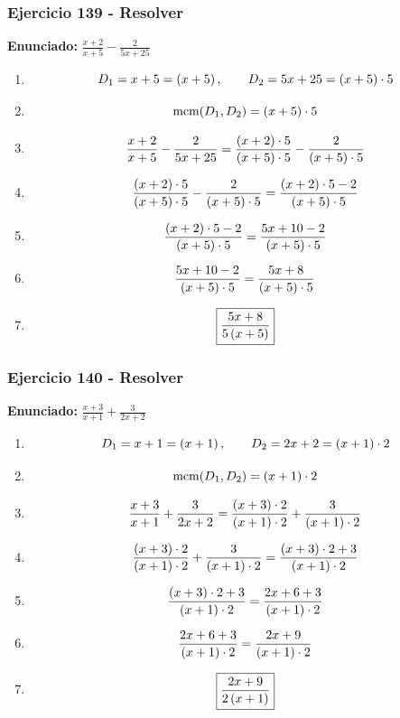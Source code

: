 \documentclass[11pt,a4paper]{article}
\newcommand{\fitmath}[1]{%
\[
\setbox0=\hbox{$\displaystyle #1$}%
\ifdim\wd0>\linewidth
\resizebox{\linewidth}{!}{$\displaystyle #1$}%
\else
#1%
\fi
\]
}
\begin{document}
\vspace{0.12cm}
\subsubsection*{Ejercicio 139 - Resolver}
\textbf{Enunciado:} $ \frac{x + 2}{x + 5} - \frac{2}{5 x + 25} $\par
\begin{enumerate}[leftmargin=2em]
\item \fitmath{D_1=x + 5=\left(x + 5\right),\qquad D_2=5 x + 25=\left(x + 5\right)\cdot 5}
\item \fitmath{\operatorname{mcm}(D_1,D_2)=\left(x + 5\right)\cdot 5}
\item \fitmath{\frac{x + 2}{x + 5} - \frac{2}{5 x + 25}= \frac{\left(x + 2\right)\cdot 5}{\left(x + 5\right)\cdot 5} - \frac{2}{\left(x + 5\right)\cdot 5}}
\item \fitmath{\frac{\left(x + 2\right)\cdot 5}{\left(x + 5\right)\cdot 5} - \frac{2}{\left(x + 5\right)\cdot 5}=\frac{\left(x + 2\right)\cdot 5 - 2}{\left(x + 5\right)\cdot 5}}
\item \fitmath{\frac{\left(x + 2\right)\cdot 5 - 2}{\left(x + 5\right)\cdot 5}=\frac{5 x + 10 - 2}{\left(x + 5\right)\cdot 5}}
\item \fitmath{\frac{5 x + 10 - 2}{\left(x + 5\right)\cdot 5}=\frac{5 x + 8}{\left(x + 5\right)\cdot 5}}
\item \fitmath{\boxed{\frac{5 x + 8}{5 \left(x + 5\right)}}}
\end{enumerate}

\vspace{0.12cm}
\subsubsection*{Ejercicio 140 - Resolver}
\textbf{Enunciado:} $ \frac{x + 3}{x + 1} + \frac{3}{2 x + 2} $\par
\begin{enumerate}[leftmargin=2em]
\item \fitmath{D_1=x + 1=\left(x + 1\right),\qquad D_2=2 x + 2=\left(x + 1\right)\cdot 2}
\item \fitmath{\operatorname{mcm}(D_1,D_2)=\left(x + 1\right)\cdot 2}
\item \fitmath{\frac{x + 3}{x + 1} + \frac{3}{2 x + 2}= \frac{\left(x + 3\right)\cdot 2}{\left(x + 1\right)\cdot 2} + \frac{3}{\left(x + 1\right)\cdot 2}}
\item \fitmath{\frac{\left(x + 3\right)\cdot 2}{\left(x + 1\right)\cdot 2} + \frac{3}{\left(x + 1\right)\cdot 2}=\frac{\left(x + 3\right)\cdot 2 + 3}{\left(x + 1\right)\cdot 2}}
\item \fitmath{\frac{\left(x + 3\right)\cdot 2 + 3}{\left(x + 1\right)\cdot 2}=\frac{2 x + 6 + 3}{\left(x + 1\right)\cdot 2}}
\item \fitmath{\frac{2 x + 6 + 3}{\left(x + 1\right)\cdot 2}=\frac{2 x + 9}{\left(x + 1\right)\cdot 2}}
\item \fitmath{\boxed{\frac{2 x + 9}{2 \left(x + 1\right)}}}
\end{enumerate}
\end{document}
